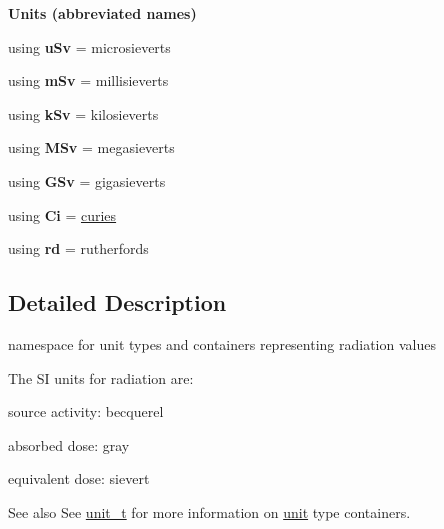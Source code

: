 \begin{Indent}{\bf Units (abbreviated names)}
\begin{DoxyCompactItemize}
\item 
\hypertarget{namespaceunits_1_1radiation_a1e4b19ab42b53ea778d6e9e4c437d0d2}{}using {\bfseries u\+Sv} = microsieverts\label{namespaceunits_1_1radiation_a1e4b19ab42b53ea778d6e9e4c437d0d2}

\item 
\hypertarget{namespaceunits_1_1radiation_a3be42c77bebaa414eaa49891911c62e6}{}using {\bfseries m\+Sv} = millisieverts\label{namespaceunits_1_1radiation_a3be42c77bebaa414eaa49891911c62e6}

\item 
\hypertarget{namespaceunits_1_1radiation_a28f007f2c8f589dbc9b9e0d2ecd2c5ca}{}using {\bfseries k\+Sv} = kilosieverts\label{namespaceunits_1_1radiation_a28f007f2c8f589dbc9b9e0d2ecd2c5ca}

\item 
\hypertarget{namespaceunits_1_1radiation_a308a131a2af3f13fcdae54aaac673553}{}using {\bfseries M\+Sv} = megasieverts\label{namespaceunits_1_1radiation_a308a131a2af3f13fcdae54aaac673553}

\item 
\hypertarget{namespaceunits_1_1radiation_a195637c0686ff5df9c4cccd39d561c08}{}using {\bfseries G\+Sv} = gigasieverts\label{namespaceunits_1_1radiation_a195637c0686ff5df9c4cccd39d561c08}

\item 
\hypertarget{namespaceunits_1_1radiation_aa64b4e117fc7cab6db24115610db523c}{}using {\bfseries Ci} = \hyperlink{structunits_1_1unit}{curies}\label{namespaceunits_1_1radiation_aa64b4e117fc7cab6db24115610db523c}

\item 
\hypertarget{namespaceunits_1_1radiation_a13a1c01a4312f6c8a8191206a89ae70c}{}using {\bfseries rd} = rutherfords\label{namespaceunits_1_1radiation_a13a1c01a4312f6c8a8191206a89ae70c}

\end{DoxyCompactItemize}
\end{Indent}


\subsection{Detailed Description}
namespace for unit types and containers representing radiation values 

The S\+I units for radiation are\+:
\begin{DoxyItemize}
\item source activity\+: becquerel
\item absorbed dose\+: gray
\item equivalent dose\+: sievert \begin{DoxySeeAlso}{See also}
See \hyperlink{classunits_1_1unit__t}{unit\+\_\+t} for more information on \hyperlink{structunits_1_1unit}{unit} type containers. 
\end{DoxySeeAlso}

\end{DoxyItemize}